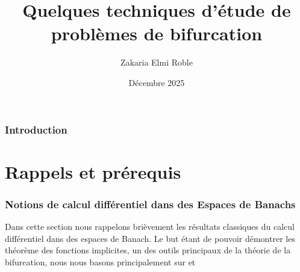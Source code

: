 \documentclass[a4paper,12pt,oneside,titlepage]{article}
\title{Quelques techniques d'étude de problèmes de bifurcation}
\author{Zakaria Elmi Roble }
\date{Décembre 2025}
\theoremstyle{definition}
\theoremstyle{plain}
\begin{document}
\maketitle
\tableofcontents
\newpage
\section*{Introduction}
\newpage
\part{Rappels et prérequis}

\section{Notions de calcul différentiel dans des Espaces de Banachs}

Dans cette section nous rappelons brièvement les résultats classiques du calcul différentiel dans des espaces de Banach. Le but étant de pouvoir démontrer les théorème des fonctions implicites, un des outils principaux de la théorie de la bifurcation, nous nous basons principalement sur \cite{dieudonne1969fma8} et \cite{coleman2012calculus}
\end{document}
